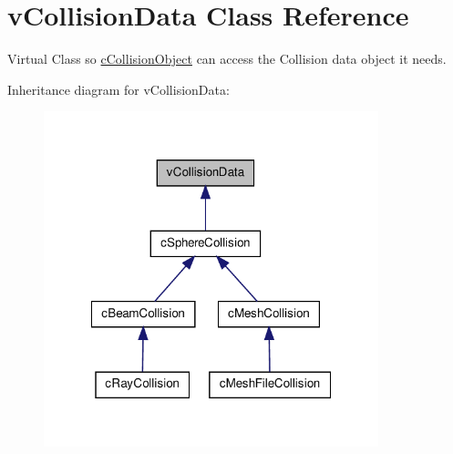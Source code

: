 \hypertarget{classv_collision_data}{
\section{vCollisionData Class Reference}
\label{classv_collision_data}
}


Virtual Class so \hyperlink{classc_collision_object}{cCollisionObject} can access the Collision data object it needs.  




Inheritance diagram for vCollisionData:
\nopagebreak
\begin{figure}[H]
\begin{center}
\leavevmode
\includegraphics[width=275pt]{classv_collision_data__inherit__graph}
\end{center}
\end{figure}
